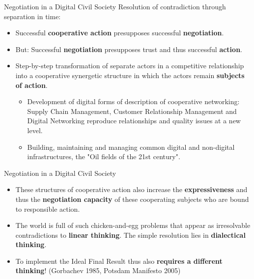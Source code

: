 \documentclass{beamer}
\begin{document}
\begin{frame}{Negotiation in a Digital Civil Society}
Resolution of contradiction through separation in time:
\begin{itemize}
\item Successful \textbf{cooperative action} presupposes successful
  \textbf{negotiation}.
\item But: Successful \textbf{negotiation} presupposes trust and thus
  successful \textbf{action}.
\item Step-by-step transformation of separate actors in a competitive
  relationship into a cooperative synergetic structure in which the actors
  remain \textbf{subjects of action}.
  \begin{itemize}
  \item Development of digital forms of description of cooperative networking:
    Supply Chain Management, Customer Relationship Management and Digital
    Networking reproduce relationships and quality issues at a new level.
  \item Building, maintaining and managing common digital and non-digital
    infrastructures, the "Oil fields of the 21st century".
  \end{itemize}
\end{itemize}
\end{frame}

\begin{frame}{Negotiation in a Digital Civil Society}
\begin{itemize}
\item These structures of cooperative action also increase the
  \textbf{expressiveness} and thus the \textbf{negotiation capacity} of these
  cooperating subjects who are bound to responsible action.
\item The world is full of such chicken-and-egg problems that appear as
  irresolvable contradictions to \textbf{linear thinking}. The simple
  resolution lies in \textbf{dialectical thinking}.
\item To implement the Ideal Final Result thus also \textbf{requires a
  different thinking}! (Gorbachev 1985, Potsdam Manifesto 2005)
\end{itemize}
\end{frame}
\end{document}
